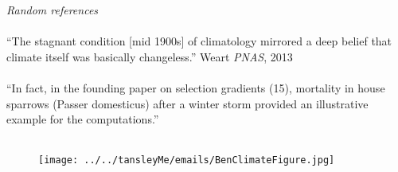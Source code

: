 \documentclass[11pt,a4paper]{article}
\begin{document}
\newpage
\noindent \emph{Random references}\\
\\
``The stagnant condition [mid 1900s] of climatology mirrored a deep belief
that climate itself was basically changeless.'' Weart \emph{PNAS}, 2013\\
\\
``In fact, in the founding paper on selection
gradients (15), mortality in house sparrows (Passer
domesticus) after a winter storm provided an illustrative
example for the computations.'' \citep{schoener2011}\\
\\
\begin{footnotesize}
{\def\section*#1{}

}
\end{footnotesize}

\begin{figure}[h!]
\centering
\noindent \texttt{[image: ../../tansleyMe/emails/BenClimateFigure.jpg]}
\end{figure}
\end{document}

